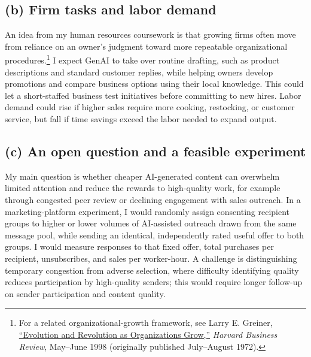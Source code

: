 \documentclass[12pt]{article}
\begin{document}
\subsection*{(b) Firm tasks and labor demand}
An idea from my human resources coursework is that growing firms often move from reliance on an owner's judgment toward more repeatable organizational procedures.\footnote{For a related organizational-growth framework, see Larry E. Greiner, \href{https://store.hbr.org/product/evolution-and-revolution-as-organizations-grow/98308}{``Evolution and Revolution as Organizations Grow,''} \textit{Harvard Business Review}, May--June 1998 (originally published July--August 1972).} I expect GenAI to take over routine drafting, such as product descriptions and standard customer replies, while helping owners develop promotions and compare business options using their local knowledge. This could let a short-staffed business test initiatives before committing to new hires. Labor demand could rise if higher sales require more cooking, restocking, or customer service, but fall if time savings exceed the labor needed to expand output.

\subsection*{(c) An open question and a feasible experiment}
My main question is whether cheaper AI-generated content can overwhelm limited attention and reduce the rewards to high-quality work, for example through congested peer review or declining engagement with sales outreach. In a marketing-platform experiment, I would randomly assign consenting recipient groups to higher or lower volumes of AI-assisted outreach drawn from the same message pool, while sending an identical, independently rated useful offer to both groups. I would measure responses to that fixed offer, total purchases per recipient, unsubscribes, and sales per worker-hour. A challenge is distinguishing temporary congestion from adverse selection, where difficulty identifying quality reduces participation by high-quality senders; this would require longer follow-up on sender participation and content quality.
\end{document}

